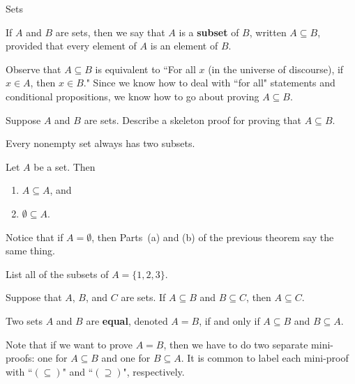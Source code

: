 \begin{section}{Sets}
\begin{definition}
If $A$ and $B$ are sets, then we say that $A$ is a \textbf{subset} of $B$, written $\boxed{A\subseteq B}$, provided that every element of $A$ is an element of $B$.
\end{definition}

Observe that $A\subseteq B$ is equivalent to ``For all $x$ (in the universe of discourse), if $x\in A$, then $x\in B$."  Since we know how to deal with ``for all" statements and conditional propositions, we know how to go about proving $A\subseteq B$.

\begin{problem}
Suppose $A$ and $B$ are sets.  Describe a skeleton proof for proving that $A\subseteq B$.
\end{problem}

Every nonempty set always has two subsets.

\begin{theorem}
Let $A$ be a set.  Then
\begin{enumerate}[label=\textrm{(\alph*)}]
\item $A\subseteq A$, and
\item $\emptyset \subseteq A$.
\end{enumerate}
\end{theorem}

Notice that if $A=\emptyset$, then Parts~(a) and (b) of the previous theorem say the same thing.

\begin{problem}
List all of the subsets of $A=\{1,2,3\}$.  %
\end{problem}

\begin{theorem}
Suppose that $A$, $B$, and $C$ are sets.  If $A\subseteq B$ and $B\subseteq C$, then $A\subseteq C$.
\end{theorem}

\begin{definition}
Two sets $A$ and $B$ are \textbf{equal}, denoted $\boxed{A=B}$, if and only if $A \subseteq B$ and $B \subseteq A$.
\end{definition}

Note that if we want to prove $A=B$, then we have to do two separate mini-proofs: one for $A\subseteq B$ and one for $B\subseteq A$. It is common to label each mini-proof with ``$(\subseteq)$" and ``$(\supseteq)$", respectively.


\end{section}
